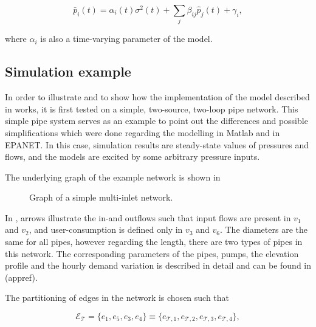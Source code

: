 \begin{equation}
\label{model_multiinlet1}
\bar{p}_i(t) = \alpha_i(t) \sigma^2(t) + \sum_j \beta_{ij} \hat{p}_j(t) + \gamma_i,
\end{equation}

where $\alpha_i$ is also a time-varying parameter of the model. 

\subsection{Simulation example}
\label{multi_inlet_network_example}

In order to illustrate and to show how the implementation of the model described in  works, it is first tested on a simple, two-source, two-loop pipe network. This simple pipe system serves as an example to point out the differences and possible simplifications which were done regarding the modelling in Matlab and in EPANET. In this case, simulation results are steady-state values of pressures and flows, and the models are excited by some arbitrary pressure inputs. 

The underlying graph of the example network is shown in 

\begin{figure}[H]
\centering
 
\caption{Graph of a simple multi-inlet network.}
\label{fig:example1_graph}
\end{figure}

In , arrows illustrate the in-and outflows such that input flows are present in $v_1 $ and $v_2$, and user-consumption is defined only in $v_3$ and $v_6$. The diameters are the same for all pipes, however regarding the length, there are two types of pipes in this network. The corresponding parameters of the pipes, pumps, the elevation profile and the hourly demand variation is described in detail and can be found in (appref). 

The partitioning of edges in the network is chosen such that

\begin{equation}
  \label{edgeorientation_example1_T}
  \mathcal{E}_{\mathcal{T}} = \{ e_1, e_5, e_3, e_4 \} \equiv \{ e_{\mathcal{T},1}, e_{\mathcal{T},2}, e_{\mathcal{T},3}, e_{\mathcal{T},4}  \},
\end{equation}

